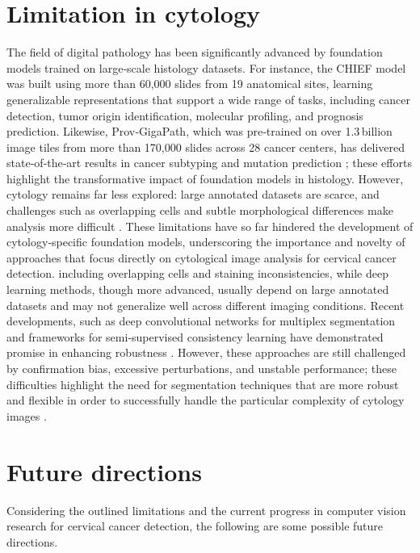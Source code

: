 \documentclass[final,5p,times,twocolumn,authoryear]{elsarticle}
\begin{document}
\section{Limitation in cytology}
The field of digital pathology has been significantly advanced by foundation models trained on large‑scale histology datasets. For instance, the CHIEF model \cite{ref156} was built using more than 60,000 slides from 19 anatomical sites, learning generalizable representations that support a wide range of tasks, including cancer detection, tumor origin identification, molecular profiling, and prognosis prediction. Likewise, Prov‑GigaPath, which was pre‑trained on over 1.3 billion image tiles from more than 170,000 slides across 28 cancer centers, has delivered state‑of‑the‑art results in cancer subtyping and mutation prediction \cite{ref157}; these efforts highlight the transformative impact of foundation models in histology. However, cytology remains far less explored: large annotated datasets are scarce, and challenges such as overlapping cells and subtle morphological differences make analysis more difficult \cite{ref156}. These limitations have so far hindered the development of cytology‑specific foundation models, underscoring the importance and novelty of approaches that focus directly on cytological image analysis for cervical cancer detection.
including overlapping cells and staining inconsistencies, while deep learning methods, though more advanced, usually depend on large annotated datasets and may not generalize well across different imaging conditions. Recent developments, such as deep convolutional networks for multiplex segmentation \cite{ref159} and frameworks for semi‑supervised consistency learning have demonstrated promise in enhancing robustness \cite{ref160}. However, these approaches are still challenged by confirmation bias, excessive perturbations, and unstable performance; these difficulties highlight the need for segmentation techniques that are more robust and flexible in order to successfully handle the particular complexity of cytology images \cite{ref161}.
\section{Future directions}
Considering the outlined limitations and the current progress in computer vision research for cervical cancer detection, the following are some possible future directions.
\end{document}

